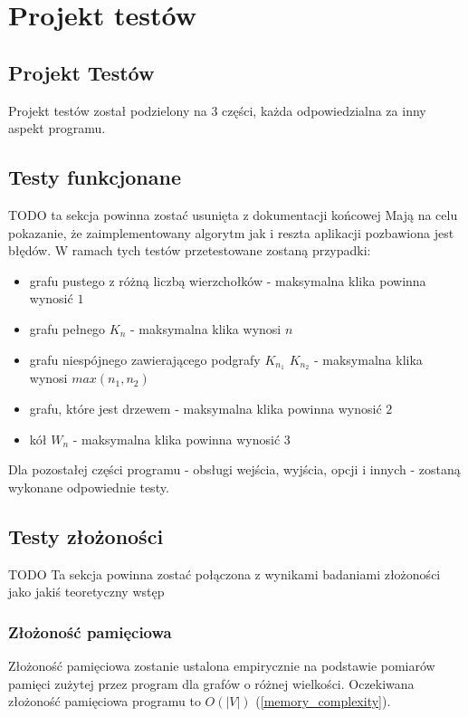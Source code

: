 \documentclass[12pt, a4paper]{article}
\begin{document}
\section{Projekt testów}
\label{sec-4}

\subsection{Projekt Testów}
Projekt testów został podzielony na 3 części, każda odpowiedzialna za inny aspekt programu.

\subsection{Testy funkcjonane}
TODO ta sekcja powinna zostać usunięta z dokumentacji końcowej
Mają na celu pokazanie, że zaimplementowany algorytm jak i reszta aplikacji pozbawiona jest błędów. W ramach tych testów przetestowane zostaną przypadki:

\begin{itemize}
\item grafu pustego z różną liczbą wierzchołków - maksymalna klika powinna wynosić $1$
\item grafu pełnego $K_{n}$ - maksymalna klika wynosi $n$
\item grafu niespójnego zawierającego podgrafy $K_{n_{1}}$ $K_{n_{2}}$ - maksymalna klika wynosi $max(n_{1}, n_{2})$
\item grafu, które jest drzewem - maksymalna klika powinna wynosić $2$
\item kół $W_{n}$ - maksymalna klika powinna wynosić $3$
\end{itemize}

Dla pozostałej części programu - obsługi wejścia, wyjścia, opcji i innych - zostaną wykonane odpowiednie testy.

\subsection{Testy złożoności}
TODO Ta sekcja powinna zostać połączona z wynikami badaniami złożoności jako jakiś teoretyczny wstęp
\subsubsection{Złożoność pamięciowa}
Złożoność pamięciowa zostanie ustalona empirycznie na podstawie pomiarów pamięci zużytej przez program dla grafów o różnej wielkości. Oczekiwana złożoność pamięciowa programu to $O(|V|)$ (\ref{memory_complexity}). 
\end{document}
